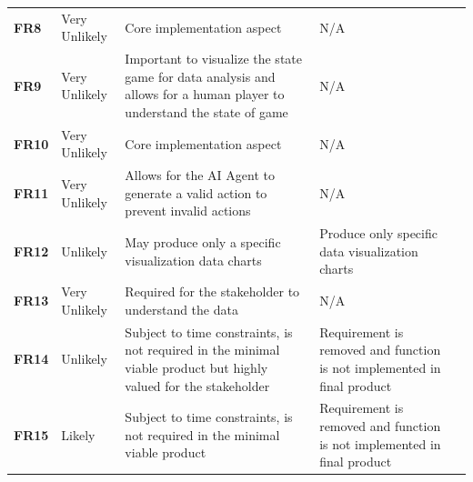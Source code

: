 \documentclass[12pt]{article}
\begin{document}
\begin{table}[H]
\begin{tabular}{|l|p{}|p{}|p{}|l}
\textbf{FR8}                                & Very Unlikely                                      & Core implementation aspect                                                                                            & N/A                                                                     &  \\ \cline{1-4}
\textbf{FR9}                                & Very Unlikely                                      & Important to visualize the state game for data analysis and allows for a human player to understand the state of game & N/A                                                                     &  \\ \cline{1-4}
\textbf{FR10}                               & Very Unlikely                                      & Core implementation aspect                                                                                            & N/A                                                                     &  \\ \cline{1-4}
\textbf{FR11}                               & Very Unlikely                                      & Allows for the AI Agent to generate a valid action to prevent invalid actions                                         & N/A                                                                     &  \\ \cline{1-4}
\textbf{FR12}                               & Unlikely                                           & May produce only a specific visualization data charts                                                                 & Produce only specific data visualization charts                         &  \\ \cline{1-4}
\textbf{FR13}                               & Very Unlikely                                      & Required for the stakeholder to understand the data                                                                   & N/A                                                                     &  \\ \cline{1-4}
\textbf{FR14}                               & Unlikely                                           & Subject to time constraints, is not required in the minimal viable product but highly valued for the stakeholder                                            & Requirement is removed and function is not implemented in final product &  \\ \cline{1-4}
\textbf{FR15}                               & Likely                                           & Subject to time constraints, is not required in the minimal viable product                                            & Requirement is removed and function is not implemented in final product &  \\ \cline{1-4}
\end{tabular}
\end{table}
\end{document}
